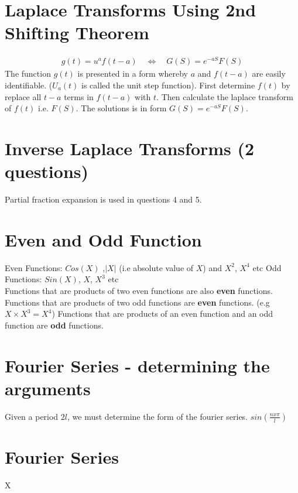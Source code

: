 \documentclass[12pt, a4paper]{article}
\begin{document}
\section{Laplace Transforms Using 2nd Shifting Theorem}

\begin{eqnarray}
 g(t) = u^{a}f(t-a) \quad \Leftrightarrow \quad G(S)= e^{-aS}F(S) \nonumber
\end{eqnarray}
The function $g(t)$ is presented in a form whereby $a$ and
$f(t-a)$ are easily identifiable. ($U_{a}(t)$ is called the unit
step function). First determine $f(t)$ by replace all $t-a$ terms
in $f(t-a)$ with $t$. Then calculate the laplace transform of
$f(t)$ i.e. $F(S)$. The solutions is in form $G(S)= e^{-aS}F(S)$.

\section{Inverse Laplace Transforms (2 questions) }
Partial fraction expansion is used in questions 4 and 5.


\section{Even and Odd Function}
Even Functions: $Cos(X)$ ,$|X|$ (i.e absolute value of $X$) and
$X^2$, $X^4$ etc
\newline
Odd Functions: $Sin(X)$, $X$, $X^3$ etc
\\
Functions that are products of two even functions are also
\textbf{even} functions.
\newline
Functions that are products of two odd functions are
\textbf{even} functions. (e.g $X \times X^3 = X^4$)
\newline
Functions that are products of an even function and an
odd function are \textbf{odd} functions.
\section{Fourier Series - determining the arguments}
Given a period $2l$, we must determine the form of the fourier
series. $sin( \frac{n x \pi}{l})$
\section{Fourier Series}
X
\end{document}
